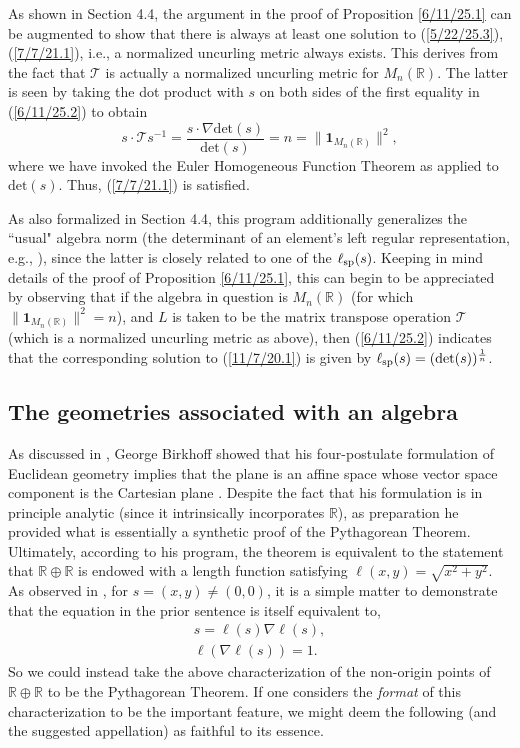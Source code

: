\documentclass{amsart}
\theoremstyle{definition}
\numberwithin{theorem}{section}
\numberwithin{equation}{section}
\begin{document}
As shown in Section 4.4, the argument in the proof of Proposition \ref{6/11/25.1} can be augmented to show that there is always at least one solution to (\ref{5/22/25.3}), (\ref{7/7/21.1}), i.e.,  a normalized uncurling metric always exists.  This derives from the fact that $\mathcal{T}$ is actually a normalized uncurling metric for $M_n(\mathbb{R})$.  The latter is seen by taking the dot product with $s$ on both sides of the first equality in (\ref{6/11/25.2}) to obtain
\begin{equation}\label{9/15/25.1}s\cdot\mathcal{T}s^{-1} = \frac{s\cdot\nabla\text{det}(s)}{\text{det}(s)} = n = \|\mathbf{1}_{M_n(\mathbb{R})}\|^2,\end{equation} 
where we have invoked the Euler Homogeneous Function Theorem as applied to $\text{det}(s)$.    Thus, (\ref{7/7/21.1}) is satisfied.   

As also formalized in Section 4.4, this program additionally generalizes the ``usual" algebra norm (the determinant of an element's left regular representation, e.g., \cite{bourbaki:1989}), since the latter is closely related to one of the $\ell_{\rm sp}(s)$. Keeping in mind details of the proof of Proposition \ref{6/11/25.1},  this can begin to be appreciated by observing that if the algebra in question is $M_n(\mathbb{R})$ (for which $\|\mathbf{1}_{M_n(\mathbb{R})}\|^2=n$), and $L$ is taken to be the matrix transpose operation $\mathcal{T}$ (which is a normalized uncurling metric as above), then (\ref{6/11/25.2}) indicates that the corresponding solution to (\ref{11/7/20.1}) is given by $\ell_{\rm sp}(s) = (\text{det}(s))^\frac{1}{n}$. 

\subsection{The geometries associated with an algebra}

As discussed in \cite{fgreensite:2025b}, George Birkhoff showed that his four-postulate formulation of Euclidean geometry implies that the plane is an affine space whose vector space component is the Cartesian plane \cite{birkhoff:1932}.  Despite the fact that his formulation is in principle analytic (since it intrinsically incorporates $\mathbb{R}$), as preparation he provided what is essentially a synthetic proof of the Pythagorean Theorem.  Ultimately, according to his program, the theorem is equivalent to the statement that $\mathbb{R}\oplus\mathbb{R}$ is endowed with a length function satisfying $\ell(x,y)=\sqrt{x^2+y^2}$.  As observed in \cite{fgreensite:2025b}, for $s=(x,y)\ne (0,0)$, it is a simple matter to demonstrate that the equation in the prior sentence is itself equivalent to, \begin{eqnarray*} s = \ell(s) \nabla \ell(s),\\  \ell(\nabla \ell(s)) = 1. \end{eqnarray*}  So we could instead take the above characterization of the non-origin points of $\mathbb{R}\oplus\mathbb{R}$ to be the Pythagorean Theorem.  If one considers the {\it format} of this characterization to be the important feature, we might deem the following (and the suggested appellation) as faithful to its essence.
\end{document}
